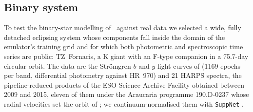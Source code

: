 
\subsection{Binary system}
\label{sec:binary_system}

To test the binary-star modelling of \spice\ against real data we selected a wide, fully detached
eclipsing system whose components fall inside the domain of the emulator's training grid and for which
both photometric and spectroscopic time series are public: TZ~Fornacis, a K giant with an F-type
companion in a 75.7-day circular orbit. The data are the Str\"omgren $b$ and $y$ light curves of
\citet{Clausen1991} (1169 epochs per band, differential photometry against HR~970) and 21 HARPS
\citep{Mayor2003} spectra, the pipeline-reduced products of the ESO Science Archive Facility obtained
between 2009 and 2015, eleven of them under the Araucaria programme 190.D-0237 whose radial velocities set
the orbit of \citet{tz_fornacis_orbit}; we continuum-normalised them with \texttt{SuppNet} \citep{suppnet}.


